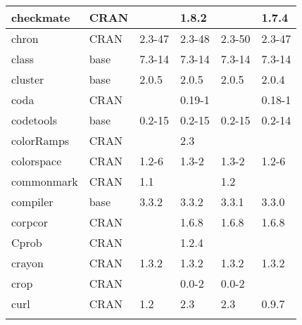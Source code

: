 \begin{longtable}{|llllll|}
checkmate                     & CRAN                      &             & 1.8.2       &                & 1.7.4             \\ \hline \rowcolor{gray!25}
chron                         & CRAN                      & 2.3-47      & 2.3-48      & 2.3-50         & 2.3-47           \\ \hline
class                         & base                      & 7.3-14      & 7.3-14      & 7.3-14         & 7.3-14            \\ \hline \rowcolor{gray!25}
cluster                       & base                      & 2.0.5       & 2.0.5       & 2.0.5          & 2.0.4            \\ \hline
coda                          & CRAN                      &             & 0.19-1      &                & 0.18-1            \\ \hline \rowcolor{gray!25}
codetools                     & base                      & 0.2-15      & 0.2-15      & 0.2-15         & 0.2-14           \\ \hline
colorRamps                    & CRAN                      &             & 2.3         &                &                   \\ \hline \rowcolor{gray!25}
colorspace                    & CRAN                      & 1.2-6       & 1.3-2       & 1.3-2          & 1.2-6            \\ \hline
commonmark                    & CRAN                      & 1.1         &             & 1.2            &                   \\ \hline \rowcolor{gray!25}
compiler                      & base                      & 3.3.2       & 3.3.2       & 3.3.1          & 3.3.0            \\ \hline
corpcor                       & CRAN                      &             & 1.6.8       & 1.6.8          & 1.6.8             \\ \hline \rowcolor{gray!25}
Cprob                         & CRAN                      &             & 1.2.4       &                &                  \\ \hline
crayon                        & CRAN                      & 1.3.2       & 1.3.2       & 1.3.2          & 1.3.2             \\ \hline \rowcolor{gray!25}
crop                          & CRAN                      &             & 0.0-2       & 0.0-2          &                  \\ \hline
curl                          & CRAN                      & 1.2         & 2.3         & 2.3            & 0.9.7             \\ \hline \rowcolor{gray!25}

\end{longtable}
